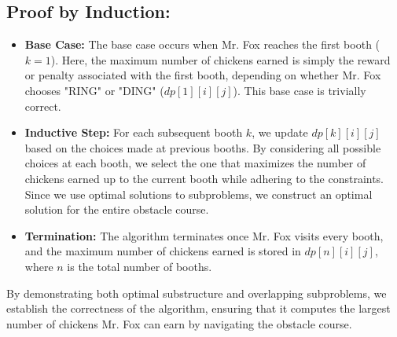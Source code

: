 \documentclass{article}
\begin{document}
\subsection*{\Large Proof by Induction:}
\begin{itemize}
    \item \textbf{Base Case:} The base case occurs when Mr. Fox reaches the first booth ($k = 1$). Here, the maximum number of chickens earned is simply the reward or penalty associated with the first booth, depending on whether Mr. Fox chooses "RING" or "DING" ($dp[1][i][j]$). This base case is trivially correct.
    
    \item \textbf{Inductive Step:} For each subsequent booth $k$, we update $dp[k][i][j]$ based on the choices made at previous booths. By considering all possible choices at each booth, we select the one that maximizes the number of chickens earned up to the current booth while adhering to the constraints. Since we use optimal solutions to subproblems, we construct an optimal solution for the entire obstacle course.
    
    \item \textbf{Termination:} The algorithm terminates once Mr. Fox visits every booth, and the maximum number of chickens earned is stored in $dp[n][i][j]$, where $n$ is the total number of booths.
\end{itemize}

By demonstrating both optimal substructure and overlapping subproblems, we establish the correctness of the algorithm, ensuring that it computes the largest number of chickens Mr. Fox can earn by navigating the obstacle course.
\end{document}
